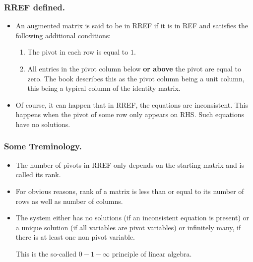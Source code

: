 \begin{frame}%
  \frametitle{RREF defined.}
  \begin{itemize}%
\item
An augmented matrix is said to be in RREF if it is in REF and satisfies
the following additional conditions:
\begin{enumerate}
\item The pivot in each row is equal to $1$.
\item All entries in the pivot column below {\bf or above}
the pivot are equal to zero. The book describes this as the pivot
column being a unit column, this being a typical column of the identity
matrix.

\end{enumerate}
\item Of course, it can happen that in RREF, the equations are
inconsistent. This happens when the pivot of some row only appears on
RHS. Such equations have no solutions.
\end{itemize}
\end{frame}
\begin{frame}%
  \frametitle{Some Treminology.}
  \begin{itemize}%

\item The number of pivots in RREF only depends on the starting matrix
and is called its rank.

\item For obvious reasons, rank of a matrix is less than or equal to its
number of rows as well as number of columns.

\item The system either has no solutions (if an inconsistent equation is
present) or a unique solution (if all variables are pivot variables) or
infinitely many, if there is at least one non pivot variable.

This is the so-called $0-1-\infty$ principle of linear algebra.

\end{itemize}
\end{frame}


